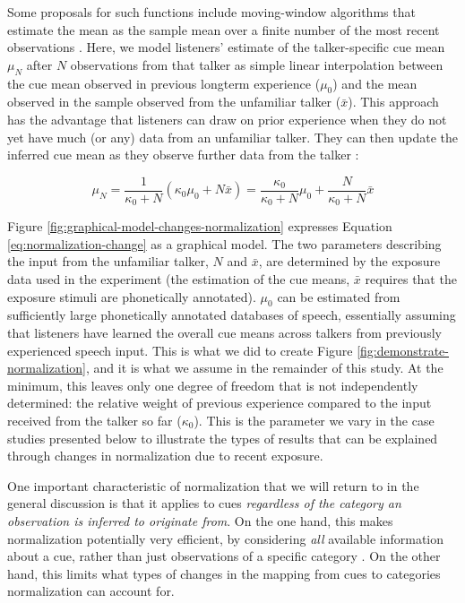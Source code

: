 \documentclass[
  11pt,
  man,floatsintext]{apa6}
\begin{document}
Some proposals for such functions include moving-window algorithms that estimate the mean as the sample mean over a finite number of the most recent observations \autocite{lee2002,zhang-peng2021}. Here, we model listeners' estimate of the talker-specific cue mean \(\mu_N\) after \(N\) observations from that talker as simple linear interpolation between the cue mean observed in previous longterm experience (\(\mu_0\)) and the mean observed in the sample observed from the unfamiliar talker (\(\bar{x}\)). This approach has the advantage that listeners can draw on prior experience when they do not yet have much (or any) data from an unfamiliar talker. They can then update the inferred cue mean as they observe further data from the talker \autocite[see discussion of the flexibility-stability trade-off in][p.~178-182]{kleinschmidt-jaeger2015}:

\begin{equation}\label{eq:normalization-change}
\mu_N = \frac{1}{\kappa_0 + N} \left( \kappa_0 \mu_0 + N \bar{x} \right) = \frac{\kappa_0}{\kappa_0 + N} \mu_0 + \frac{N}{\kappa_0 + N}\bar{x}
\end{equation}

Figure \ref{fig:graphical-model-changes-normalization} expresses Equation \eqref{eq:normalization-change} as a graphical model. The two parameters describing the input from the unfamiliar talker, \(N\) and \(\bar{x}\), are determined by the exposure data used in the experiment (the estimation of the cue means, \(\bar{x}\) requires that the exposure stimuli are phonetically annotated). \(\mu_0\) can be estimated from sufficiently large phonetically annotated databases of speech, essentially assuming that listeners have learned the overall cue means across talkers from previously experienced speech input. This is what we did to create Figure \ref{fig:demonstrate-normalization}, and it is what we assume in the remainder of this study. At the minimum, this leaves only one degree of freedom that is not independently determined: the relative weight of previous experience compared to the input received from the talker so far (\(\kappa_0\)). This is the parameter we vary in the case studies presented below to illustrate the types of results that can be explained through changes in normalization due to recent exposure.

One important characteristic of normalization that we will return to in the general discussion is that it applies to cues \emph{regardless of the category an observation is inferred to originate from}. On the one hand, this makes normalization potentially very efficient, by considering \emph{all} available information about a cue, rather than just observations of a specific category \autocite{apfelbaum-mcmurray2015}. On the other hand, this limits what types of changes in the mapping from cues to categories normalization can account for.
\end{document}
